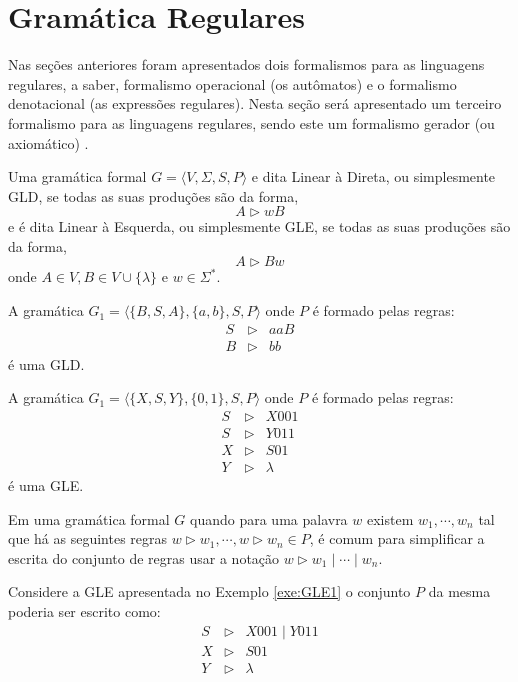 \section{Gramática Regulares}\label{sec:GramaticaRegular}

Nas seções anteriores foram apresentados dois formalismos para as linguagens regulares, a saber, formalismo operacional (os autômatos) e o formalismo denotacional (as expressões regulares). Nesta seção será apresentado um terceiro formalismo para as linguagens regulares, sendo este um formalismo gerador (ou axiomático) \cite{menezes1998LFA}. 

\begin{definition}\label{def:GramaticaLinear}
	Uma gramática formal $G = \langle V, \Sigma, S, P \rangle$ e dita Linear à Direta, ou simplesmente GLD, se todas as suas produções são da forma, 
	$$A \rhd wB$$
	e é dita Linear à Esquerda, ou simplesmente GLE, se todas as suas produções são da forma, 
	$$A \rhd Bw$$
	onde $A \in V, B \in V \cup \{\lambda\}$ e $w \in \Sigma^*$.
\end{definition}

\begin{example}
	A gramática $G_1 = \langle \{B, S , A\}, \{a, b\}, S, P \rangle$ onde $P$ é formado pelas regras:
	\begin{eqnarray*}
		S & \rhd & aaB\\
		B & \rhd & bb
	\end{eqnarray*}
	é uma GLD.
\end{example}

\begin{example}\label{exe:GLE1}
	A gramática $G_1 = \langle \{X, S , Y\}, \{0, 1\}, S, P \rangle$ onde $P$ é formado pelas regras:
	\begin{eqnarray*}
		S & \rhd & X001\\
		S & \rhd & Y011\\
		X & \rhd & S01\\
		Y & \rhd & \lambda
	\end{eqnarray*}
	é uma GLE.
\end{example}

Em uma gramática formal $G$ quando para uma palavra $w$ existem $w_1, \cdots, w_n$ tal que há as seguintes regras $w \rhd w_1, \cdots, w \rhd w_n \in P$, é comum para simplificar a escrita do conjunto de regras usar a notação $w \rhd w_1 \mid \cdots \mid w_n$. 

\begin{example}\label{exe:GLE}
	Considere a GLE apresentada no Exemplo \ref{exe:GLE1} o conjunto $P$ da mesma poderia ser escrito como:
	\begin{eqnarray*}
		S & \rhd & X001 \mid Y011\\
		X & \rhd & S01\\
		Y & \rhd & \lambda
	\end{eqnarray*}
\end{example}

